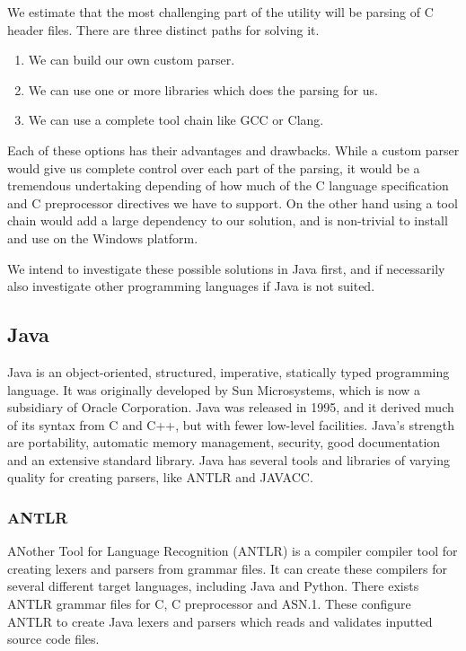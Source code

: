 \begin{description}
We estimate that the most challenging part of the utility will be parsing of C
header files. There are three distinct paths for solving it.
\begin{enumerate}
	\item We can build our own custom parser.
	\item We can use one or more libraries which does the parsing for us.
	\item We can use a complete tool chain like GCC or Clang.
\end{enumerate}

\noindent Each of these options has their advantages and drawbacks. While a
custom parser would give us complete control over each part of the parsing, it
would be a tremendous undertaking depending of how much of the C language
specification and C preprocessor directives we have to support. On the other
hand using a tool chain would add a large dependency to our solution, and is
non-trivial to install and use on the Windows platform.

We intend to investigate these possible solutions in Java first, and if
necessarily also investigate other programming languages if Java is not suited.

\subsection{Java}
Java is an object-oriented, structured, imperative, statically typed
programming language. It was originally developed by Sun Microsystems, which
is now a subsidiary of Oracle Corporation. Java was released in 1995, and it
derived much of its syntax from C and C++, but with fewer low-level facilities.
Java’s strength are portability, automatic memory management, security, good
documentation and an extensive standard library. Java has several tools and
libraries of varying quality for creating parsers, like ANTLR and JAVACC.

\subsubsection{ANTLR}
ANother Tool for Language Recognition (ANTLR) is a compiler compiler tool for
creating lexers and parsers from grammar files. It can create these compilers
for several different target languages, including Java and Python. There exists
ANTLR grammar files for C, C preprocessor and ASN.1. These configure ANTLR to
create Java lexers and parsers which reads and validates inputted source code
files.


\end{description}
